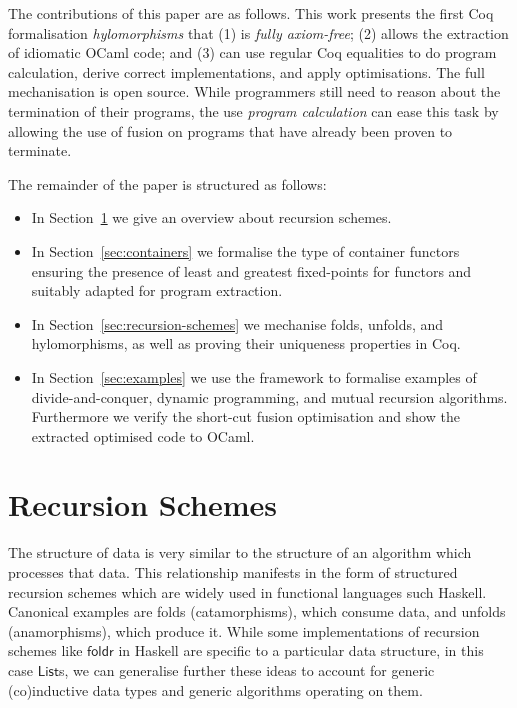 \documentclass{llncs}
\newcommand{\dcas}[1]{\textcolor{ForestGreen}{\textsc{David}: #1}}
\newcommand{\operator}[1]{\textsf{#1}}
\begin{document}
The contributions of this paper are as follows.  This work presents the first
Coq formalisation \emph{hylomorphisms} that (1) is \emph{fully axiom-free}; (2)
allows the extraction of idiomatic OCaml code; and (3) can use regular Coq
equalities to do program calculation, derive correct implementations, and apply
optimisations.
The full mechanisation is open source.
While programmers still need to reason about the termination of their programs,
the use \emph{program calculation} can ease this task by allowing the use of
fusion on programs that have already been proven to terminate.
%

The remainder of the paper is structured as follows:
\begin{itemize}
  \item In Section~\ref{sec:rec-schemes} we give an overview about recursion
schemes.
  \item In Section~\ref{sec:containers} we formalise the type of container
functors ensuring the presence of least and greatest fixed-points for functors
and suitably adapted for program extraction.
  \item In Section~\ref{sec:recursion-schemes} we mechanise folds, unfolds, and
hylomorphisms, as well as proving their uniqueness properties in Coq.
  \item In Section~\ref{sec:examples} we use the framework to formalise examples
of divide-and-conquer, dynamic programming, and mutual recursion algorithms.
Furthermore we verify the short-cut fusion optimisation and show the extracted
optimised code to OCaml.
\end{itemize}

\section{Recursion Schemes}\label{sec:rec-schemes}
The structure of data is very similar to the structure of an
algorithm which processes that data. This relationship manifests in the form of
structured recursion schemes which are widely used in functional languages such
Haskell. Canonical examples are folds (catamorphisms), which consume data, and
unfolds (anamorphisms), which produce it. While some implementations of
recursion schemes like $\operator{foldr}$ in Haskell are specific to a particular
data structure, in this case $\operator{List}$s, we can generalise further these
ideas to account for generic (co)inductive data types and generic algorithms
operating on them.
\end{document}
